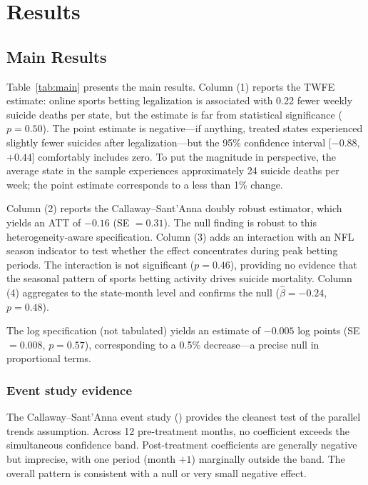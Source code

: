 \documentclass[12pt]{article}
\begin{document}
\section{Results}

\subsection{Main Results}



Table~\ref{tab:main} presents the main results. Column (1) reports the TWFE estimate: online sports betting legalization is associated with 0.22 fewer weekly suicide deaths per state, but the estimate is far from statistical significance ($p = 0.50$). The point estimate is negative---if anything, treated states experienced slightly fewer suicides after legalization---but the 95\% confidence interval [$-0.88$, $+0.44$] comfortably includes zero. To put the magnitude in perspective, the average state in the sample experiences approximately 24 suicide deaths per week; the point estimate corresponds to a less than 1\% change.

Column (2) reports the Callaway--Sant'Anna doubly robust estimator, which yields an ATT of $-0.16$ (SE $= 0.31$). The null finding is robust to this heterogeneity-aware specification. Column (3) adds an interaction with an NFL season indicator to test whether the effect concentrates during peak betting periods. The interaction is not significant ($p = 0.46$), providing no evidence that the seasonal pattern of sports betting activity drives suicide mortality. Column (4) aggregates to the state-month level and confirms the null ($\hat{\beta} = -0.24$, $p = 0.48$).

The log specification (not tabulated) yields an estimate of $-0.005$ log points (SE $= 0.008$, $p = 0.57$), corresponding to a 0.5\% decrease---a precise null in proportional terms.

\subsubsection*{Event study evidence} The Callaway--Sant'Anna event study () provides the cleanest test of the parallel trends assumption. Across 12 pre-treatment months, no coefficient exceeds the simultaneous confidence band. Post-treatment coefficients are generally negative but imprecise, with one period (month $+1$) marginally outside the band. The overall pattern is consistent with a null or very small negative effect.
\end{document}
